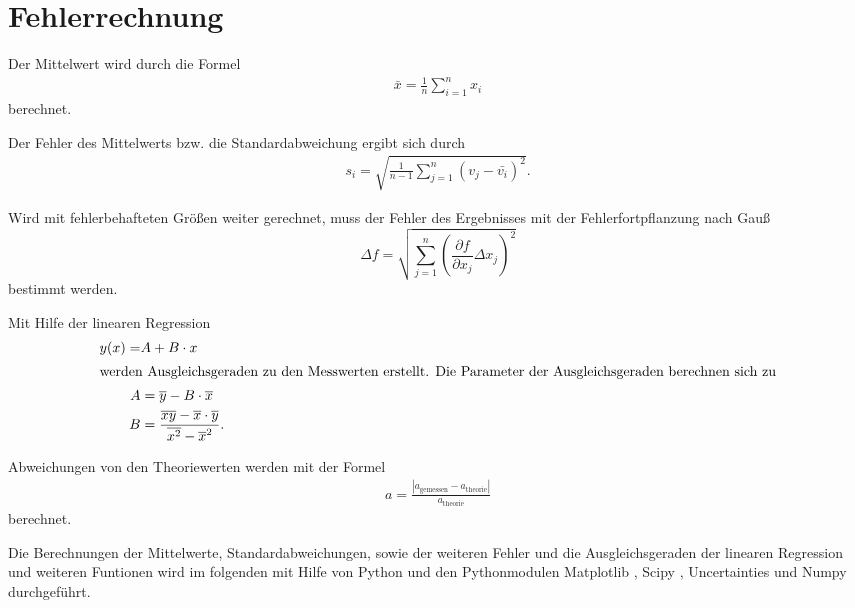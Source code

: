 \section{Fehlerrechnung}
\label{sec:Fehlerrechnung}

Der Mittelwert wird durch die Formel
\begin{align*}
    \bar{x}=\frac{1}{n} \sum_{i=1}^n x_i \label{eqn:Mittelwert}
\end{align*}
berechnet.

Der Fehler des Mittelwerts bzw. die Standardabweichung ergibt sich durch
\begin{align*}
    s_i=\sqrt{\frac{1}{n-1}\sum_{j=1}^n (v_j-\bar{v_i})^2}.
\end{align*}

Wird mit fehlerbehafteten Größen weiter gerechnet, muss der Fehler des Ergebnisses mit der Fehlerfortpflanzung nach Gauß
\begin{equation*}
    \Delta f=\sqrt{\sum_{j=1}^n \left(\frac{\partial f}{\partial x_j}\Delta x_j \right)^{2} }\label{eqn:Gauß}
\end{equation*}
bestimmt werden.

Mit Hilfe der linearen Regression 
\begin{subequations}
    \label{eqn:lin}
\begin{align}
    y(x)=&A+B\cdot x\\
    \intertext{werden Ausgleichsgeraden zu den Messwerten erstellt. Die Parameter der Ausgleichsgeraden berechnen sich zu}
    A&=\overline{y}-B\cdot \overline{x}\label{eqn:lina}\\
    B&=\frac{\overline{xy}-\overline{x}\cdot \overline{y}}{\overline{x^2}-\overline{x}^2}\label{eqn:linb}.
\end{align}
\end{subequations}

Abweichungen von den Theoriewerten werden mit der Formel
\begin{align}
  a=\frac{|a_\mathrm{gemessen}-a_\mathrm{theorie}|}{a_\mathrm{theorie}} \label{eqn:abweich}
\end{align}
berechnet.

Die Berechnungen der Mittelwerte, Standardabweichungen, sowie der weiteren Fehler und die Ausgleichsgeraden der linearen Regression und weiteren Funtionen
wird im folgenden mit Hilfe von Python und den Pythonmodulen Matplotlib \cite{matplotlib}, Scipy \cite{scipy}, Uncertainties \cite{uncertainties} und Numpy \cite{numpy}
durchgeführt.